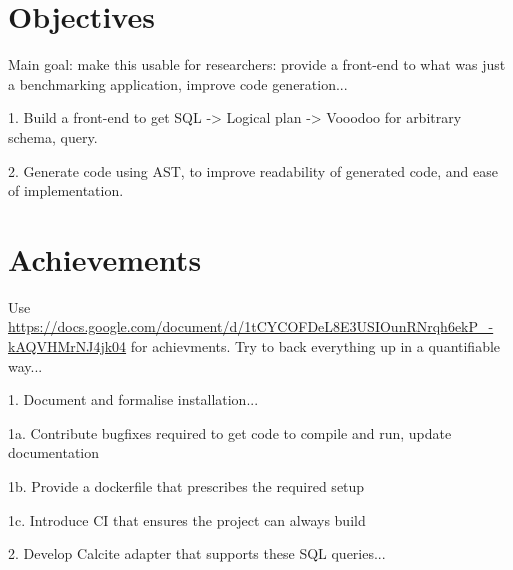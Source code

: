\section{Objectives}

Main goal: make this usable for researchers: provide a front-end to what was just a benchmarking application, improve code generation...

1. Build a front-end to get SQL -> Logical plan -> Vooodoo for arbitrary schema, query.

2. Generate code using AST, to improve readability of generated code, and ease of implementation.

\section{Achievements}

Use \url{https://docs.google.com/document/d/1tCYCOFDeL8E3USIOunRNrqh6ekP_-kAQVHMrNJ4jk04} for achievments. Try to back everything up in a quantifiable way...



1. Document and formalise installation...

1a. Contribute bugfixes required to get code to compile and run, update documentation

1b. Provide a dockerfile that prescribes the required setup

1c. Introduce CI that ensures the project can always build

2. Develop Calcite adapter that supports these SQL queries...

